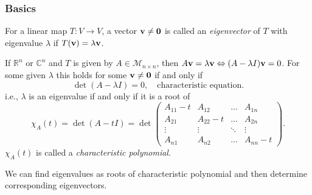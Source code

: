\documentclass[10pt]{article}
\begin{document}
    \subsubsection{Basics}
    \begin{definition}
        For a linear map $T:V\to V$, a vector ${\bf v}\neq \mathbf{0}$ is called an \textit{eigenvector} of $T$ with eigenvalue $\lambda$ if $ T({\bf v})=\lambda{\bf v} $.
    \end{definition}
    If $ \mathbb{R}^{n} $ or $ \mathbb{C}^{n} $ and $T$ is given by $ A\in \mathcal{M}_{n\times n} $, then $ A{\bf v}=\lambda{\bf v} \Leftrightarrow (A-\lambda I){\bf v}=0 $. For some given $ \lambda $ this holds for some $ {\bf v}\neq \mathbf{0} $ if and only if 
    \[
        \det (A-\lambda I)=0,\quad \text{characteristic equation}
    .\]
    i.e., $ \lambda $ is an eigenvalue if and only if it is a root of 
    \[
        \chi_A(t) = \det (A-tI) = \det\begin{pmatrix}
            A_{11}-t & A_{12} & \ldots & A_{1 n} \\
            A_{21} & A_{22}-t & \ldots & A_{2 n} \\
            \vdots &\vdots & \ddots  & \vdots \\
            A_{n 1} & A_{n 2} & \ldots & A_{n n}-t
        \end{pmatrix}
    .\]
    $ \chi_A(t) $ is called a \textit{characteristic polynomial}.

    We can find eigenvalues as roots of characteristic polynomial and then determine corresponding eigenvectors.
\end{document}
